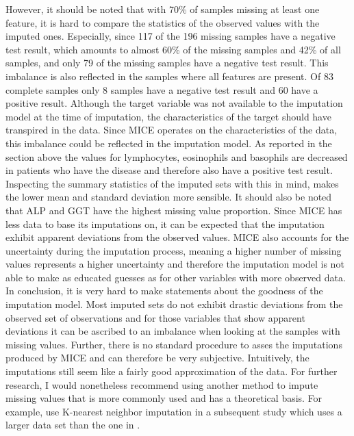 However, it should be noted that with 70\% of samples missing at least one 
feature, it is hard to compare the statistics of the observed values with the 
imputed ones. Especially, since 117 of the 196 missing samples have a negative 
test result, which amounts to almost 60\% of the missing samples and 42\% of 
all samples, and only 79 of the missing samples have a negative test result. 
This imbalance is also reflected in the samples where all features are present. 
Of 83 complete samples only 8 samples have a negative test result and 60 have a 
positive result. Although the target variable was not available to the 
imputation model at the time of imputation, the characteristics of the target 
should have transpired in the data.
Since MICE operates on the characteristics 
of the data, this imbalance could be reflected in the imputation model. As 
reported in the section above the values for lymphocytes, eosinophils and 
basophils are decreased in patients who have the disease and therefore also 
have a positive test result. Inspecting the summary statistics of the 
imputed sets with this in mind, makes the lower mean and standard deviation 
more sensible.
It should also be noted that ALP and GGT have the highest missing value 
proportion. Since MICE has less data to base its imputations on, it can be 
expected that the imputation exhibit apparent deviations from the observed 
values. MICE also accounts for the uncertainty during the imputation process, 
meaning a higher number of missing values represents a higher uncertainty and 
therefore the imputation model is not able to make as educated guesses as for 
other variables with more observed data.
\\
In conclusion, it is very hard to make statements about the goodness of the 
imputation model. Most imputed sets do not exhibit drastic deviations from the 
observed set of observations and for those variables that show apparent 
deviations it can be ascribed to an imbalance when looking at the samples with 
missing values. Further, there is no standard procedure to asses the 
imputations produced by MICE and can therefore be very subjective. Intuitively, 
the imputations still seem like a fairly good approximation of the data.
For further research, I would nonetheless recommend using another method to 
impute missing values that is more commonly used and has a theoretical basis. 
For example, \citeauthor{RN127} use K-nearest neighbor imputation in a 
subsequent study \cite{RN179} which uses a larger data set than the one in 
\cite{RN127}.

